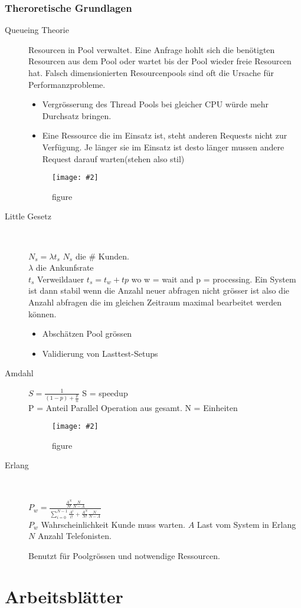 \documentclass[a4paper,10pt]{scrreprt}
\newcommand{\pic}[2][figure]{\begin{figure}[h]
 \centering
 \texttt{[image: \#2]}
 \caption{#1}
\end{figure}
}
\begin{document}
\section{Theroretische Grundlagen} %
\label{sec:theroretische_grundlagen}
\begin{description}
	\item[Queueing Theorie] Resourcen in Pool verwaltet. Eine Anfrage hohlt sich die benötigten Resourcen aus dem Pool oder wartet bis der Pool wieder freie Resourcen hat. Falsch dimensionierten Resourcenpools sind oft die Ursache für Performanzprobleme.
	\begin{itemize}
		\item Vergrösserung des Thread Pools bei gleicher CPU würde mehr Durchsatz bringen.
		\item Eine Ressource die im Einsatz ist, steht anderen Requests nicht zur Verfügung. Je länger sie im Einsatz ist desto länger mussen andere Request darauf warten(stehen also stil)
	\end{itemize}
	\pic{qtr.png}
	\item[Little Gesetz] \hfill \\
	\begin{framed}
		$N_s = \lambda t_s$
		$N_s$ die \# Kunden.\\
		$\lambda$ die Ankunfsrate\\
		$t_s$ Verweildauer $ t_s = t_{w} + t{p}$ wo w = wait and p = processing.
		Ein System ist dann stabil wenn die Anzahl neuer abfragen nicht grösser ist also die Anzahl abfragen die im gleichen Zeitraum maximal bearbeitet werden können.
	\end{framed}
\begin{itemize}
	\item Abschätzen Pool grössen
	\item Validierung von Lasttest-Setups
\end{itemize}
\item[Amdahl] \hfill
\begin{framed}
	$ S = \frac{1}{(1-p)+\frac{p}{n}}$
	S = speedup \\
	P = Anteil  Parallel Operation aus gesamt.
	N = Einheiten
\end{framed}
\pic{agraph.png}
\item[Erlang] \hfill \\
\begin{framed}
	$P_w = \frac{\frac{A^N}{N!} \frac{N}{N-A}}{\sum^{N-1}_{i=0} \frac{A^i}{i!} + \frac{A^N}{N!} \frac{N}{N-A}}$\\
	$P_w$ Wahrscheinlichkeit Kunde muss warten.
	$A$ Last vom System in Erlang
	$N$ Anzahl Telefonisten.
\end{framed}
Benutzt für Poolgrössen und notwendige Ressourcen.
\end{description}
\part{Arbeitsblätter}
\end{document}
